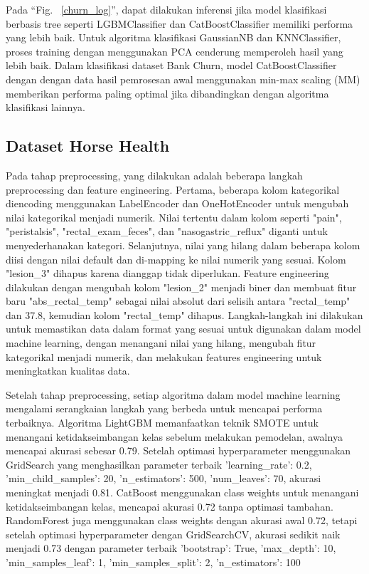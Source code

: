 \documentclass[conference]{IEEEtran}
\begin{document}
Pada ``Fig. ~\ref{churn_log}'', dapat dilakukan inferensi jika model klasifikasi berbasis tree seperti LGBMClassifier dan CatBoostClassifier memiliki performa yang lebih baik. Untuk algoritma klasifikasi 
GaussianNB dan KNNClassifier, proses training dengan menggunakan PCA cenderung memperoleh hasil yang lebih baik. Dalam klasifikasi dataset Bank Churn, model CatBoostClassifier dengan dengan data hasil pemrosesan awal 
menggunakan min-max scaling (MM) memberikan performa paling optimal jika dibandingkan dengan algoritma klasifikasi lainnya.

\subsection{Dataset Horse Health}
Pada tahap preprocessing, yang dilakukan adalah beberapa langkah preprocessing dan feature engineering. Pertama, beberapa kolom kategorikal diencoding menggunakan LabelEncoder dan OneHotEncoder untuk mengubah nilai kategorikal menjadi numerik. 
Nilai tertentu dalam kolom seperti "pain", "peristalsis", "rectal\_exam\_feces", dan "nasogastric\_reflux" diganti untuk menyederhanakan kategori. Selanjutnya, nilai yang hilang dalam beberapa kolom diisi dengan nilai default dan di-mapping ke nilai numerik yang sesuai. 
Kolom "lesion\_3" dihapus karena dianggap tidak diperlukan. Feature engineering dilakukan dengan mengubah kolom "lesion\_2" menjadi biner dan membuat fitur baru "abs\_rectal\_temp" sebagai nilai absolut dari selisih antara "rectal\_temp" dan 37.8, kemudian kolom 
"rectal\_temp" dihapus. Langkah-langkah ini dilakukan untuk memastikan data dalam format yang sesuai untuk digunakan dalam model machine learning, dengan menangani nilai yang hilang, mengubah fitur kategorikal menjadi numerik, dan melakukan features engineering untuk meningkatkan kualitas data.

Setelah tahap preprocessing, setiap algoritma dalam model machine learning mengalami serangkaian langkah yang berbeda untuk mencapai performa terbaiknya. Algoritma LightGBM memanfaatkan teknik SMOTE untuk menangani ketidakseimbangan kelas sebelum melakukan pemodelan, 
awalnya mencapai akurasi sebesar 0.79. Setelah optimasi hyperparameter menggunakan GridSearch yang menghasilkan parameter terbaik {'learning\_rate': 0.2, 'min\_child\_samples': 20, 'n\_estimators': 500, 'num\_leaves': 70}, akurasi meningkat menjadi 0.81. 
CatBoost menggunakan class weights untuk menangani ketidakseimbangan kelas, mencapai akurasi 0.72 tanpa optimasi tambahan. RandomForest juga menggunakan class weights dengan akurasi awal 0.72, tetapi setelah optimasi hyperparameter 
dengan GridSearchCV, akurasi sedikit naik menjadi 0.73 dengan parameter terbaik {'bootstrap': True, 'max\_depth': 10, 'min\_samples\_leaf': 1, 'min\_samples\_split': 2, 'n\_estimators': 100}
\end{document}
